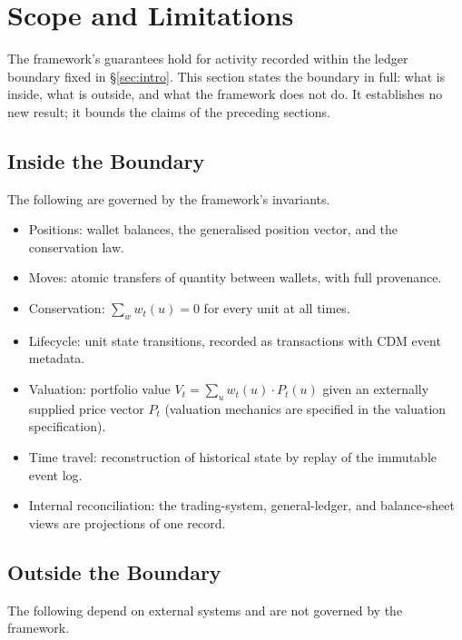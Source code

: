 \section{Scope and Limitations}
\label{sec:sec18}
\label{sec:scope-limitations}

The framework's guarantees hold for activity recorded within the ledger boundary fixed in \S\ref{sec:intro}. This section states the boundary in full: what is inside, what is outside, and what the framework does not do. It establishes no new result; it bounds the claims of the preceding sections.

\subsection{Inside the Boundary}

The following are governed by the framework's invariants.

\begin{itemize}[nosep]
\item Positions: wallet balances, the generalised position vector, and the conservation law.
\item Moves: atomic transfers of quantity between wallets, with full provenance.
\item Conservation: $\sum_w w_t(u) = 0$ for every unit at all times.
\item Lifecycle: unit state transitions, recorded as transactions with CDM event metadata.
\item Valuation: portfolio value $V_t = \sum_u w_t(u)\cdot P_t(u)$ given an externally supplied price vector $P_t$ (valuation mechanics are specified in the valuation specification).
\item Time travel: reconstruction of historical state by replay of the immutable event log.
\item Internal reconciliation: the trading-system, general-ledger, and balance-sheet views are projections of one record.
\end{itemize}

\subsection{Outside the Boundary}

The following depend on external systems and are not governed by the framework.

